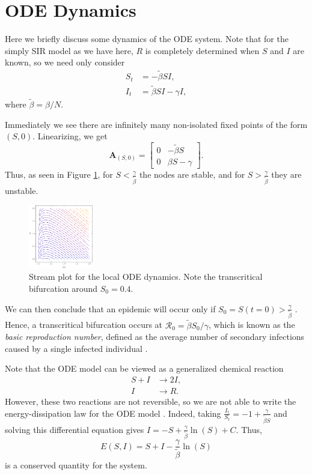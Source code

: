 \documentclass[11pt]{article}
\newcommand{\Ro}{\mathcal{R}_0}
\begin{document}
\appendix
\section{ODE Dynamics}
Here we briefly discuss some dynamics of the ODE system.
Note that for the simply SIR model as we have here, $R$ is completely determined when $S$ and $I$ are known, so we need only consider
\begin{align*}
S_t	&=	- \tilde{\beta} SI, \\
I_t	&=	\tilde{\beta} SI - \gamma I,
\end{align*}
where $\tilde{\beta} = \beta / N$.

Immediately we see there are infinitely many non-isolated fixed points of the form $(S,0)$.
Linearizing, we get
\begin{equation*}
\mathbf{A}_{(S,0)} = \begin{bmatrix} 0 & - \tilde{\beta} S \\ 0 & \beta S - \gamma \end{bmatrix}.
\end{equation*}
Thus, as seen in Figure \ref{fig:localdyn}, for $S < \frac{\gamma}{\tilde{\beta}}$ the nodes are stable, and for $S > \frac{\gamma}{\tilde{\beta}}$ they are unstable.
\begin{figure}[h]
	\centering
	\includegraphics[width=0.25\textwidth]{local_dynamics}
	\caption{Stream plot for the local ODE dynamics. Note the transcritical bifurcation around $S_0 = 0.4$.}
	\label{fig:localdyn}
\end{figure}
We can then conclude that an epidemic will occur only if $S_0 = S(t=0) > \frac{\gamma}{\tilde{\beta}}$ \cite{Wang_SIR}.
Hence, a transcritical bifurcation occurs at $\Ro = \tilde{\beta} S_0 / \gamma$, which is known as the \textit{basic reproduction number}, defined as the average number of secondary infections caused by a single infected individual \cite{Drossinos_2020}.

Note that the ODE model can be viewed as a generalized chemical reaction
\begin{align*}
S + I	&\longrightarrow	2 I, \\
I		&\longrightarrow	R.
\end{align*}
However, these two reactions are not reversible, so we are not able to write the energy-dissipation law for the ODE model \cite{Forster_2013, Wang_2020}.
Indeed, taking $\frac{I_t}{S_t} = - 1 + \frac{\gamma}{\tilde{\beta} S}$ and solving this differential equation gives $I = - S + \frac{\gamma}{\tilde{\beta}} \ln(S) + C$.
Thus,
\begin{equation}
E(S,I) = S + I - \frac{\gamma}{\tilde{\beta}} \ln(S)
\end{equation}
is a conserved quantity for the system.



\end{document}
